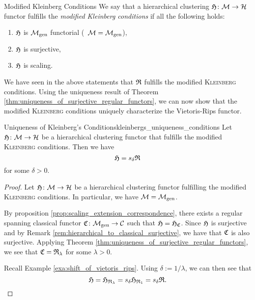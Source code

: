 \begin{definition}{Modified Kleinberg Conditions \cite[Sec.~7.3.1]{Carlsson2010}}{}
    We say that a hierarchical clustering $\mathfrak{H}\colon \mathcal{M} \to \mathcal{H}$ functor fulfills the \emph{modified Kleinberg conditions} if all the following holds:
    \begin{enumerate}
        \item $\mathfrak{H}$ is ${\mathcal{M}_\mathrm{gen}}$ functorial (\ie\ $\mathcal{M} = {\mathcal{M}_\mathrm{gen}}$),
        \item $\mathfrak{H}$ is surjective,
        \item $\mathfrak{H}$ is scaling.
    \end{enumerate}
\end{definition}

We have seen in the above statements that $\mathfrak{R}$ fulfills the modified \textsc{Kleinberg} conditions.
Using the uniqueness result of Theorem \ref{thm:uniqueness_of_surjective_regular_functors}, we can now show that the modified \textsc{Kleinberg} conditions uniquely characterize the Vietoris-Rips functor.

\begin{theorem}{Uniqueness of Kleinberg's Conditions}{kleinbergs_uniqueness_conditions}
    Let $\mathfrak{H}\colon \mathcal{M} \to \mathcal{H}$ be a hierarchical clustering functor that fulfills the modified \textsc{Kleinberg} conditions. Then we have
    $$
    \mathfrak{H} = s_\delta \mathfrak{R}
    $$
    for some $\delta > 0$.
\end{theorem}

\begin{proof}
Let $\mathfrak{H}\colon \mathcal{M} \to \mathcal{H}$ be a hierarchical clustering functor fulfilling the modified \textsc{Kleinberg} conditions. In particular, we have $\mathcal{M} = {\mathcal{M}_\mathrm{gen}}$.

By proposition \ref{prop:scaling_extension_correspondence}, there exists a regular spanning classical functor ${\mathfrak{C}\colon {\mathcal{M}_\mathrm{gen}} \to \mathcal{C}}$ such that $\mathfrak{H} = \mathfrak{H}_{\mathfrak{C}}$.
Since $\mathfrak{H}$ is surjective and by Remark \ref{rem:hierarchical_to_classical_surjective}, we have that $\mathfrak{C}$ is also surjective.
Applying Theorem \ref{thm:uniqueness_of_surjective_regular_functors}, we see that $\mathfrak{C} = \mathfrak{R}_{\lambda}$ for some $\lambda > 0$.


Recall Example \ref{exa:shift_of_vietoris_rips}. Using $\delta := 1/\lambda$, we can then see that
$$
\mathfrak{H} = \mathfrak{H}_{\mathfrak{R}_\lambda} = s_\delta \mathfrak{H}_{\mathfrak{R}_1} = s_\delta \mathfrak{R}.
$$
\end{proof}
